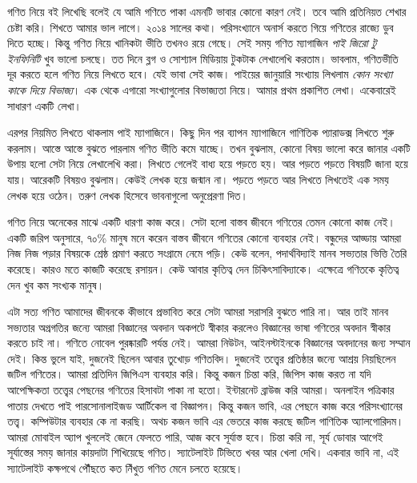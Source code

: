 \documentclass[
]{book}
\begin{document}
গণিত নিয়ে বই লিখেছি বলেই যে আমি গণিতে পাকা এমনটি ভাবার কোনো কারণ নেই। তবে আমি প্রতিনিয়ত শেখার চেষ্টা করি। শিখতে আমার ভাল লাগে। ২০১৪ সালের কথা। পরিসংখ্যানে অনার্স করতে গিয়ে গণিতের রাজ্যে ডুব দিতে হচ্ছে। কিন্তু গণিত নিয়ে খানিকটা ভীতি তখনও রয়ে গেছে। সেই সময় গণিত ম্যাগাজিন \emph{পাই জিরো টু ইনফিনিটি} খুব ভালো চলছে। তত দিনে ব্লগ ও সোশ্যাল মিডিয়ায় টুকটাক লেখালেখি করতাম। ভাবলাম, গণিতভীতি দূর করতে হলে গণিত নিয়ে লিখতে হবে। যেই ভাবা সেই কাজ। পাইয়ের জানুয়ারি সংখ্যায় লিখলাম \emph{কোন সংখ্যা কাকে দিয়ে বিভাজ্য}। এক থেকে এগারো সংখ্যাগুলোর বিভাজ্যতা নিয়ে। আমার প্রথম প্রকাশিত লেখা। একেবারেই সাধারণ একটি লেখা।

এরপর নিয়মিত লিখতে থাকলাম পাই ম্যাগাজিনে। কিছু দিন পর ব্যাপন ম্যাগাজিনে গাণিতিক প্যারাডক্স লিখতে শুরু করলাম। আস্তে আস্তে বুঝতে পারলাম গণিত ভীতি কমে যাচ্ছে। তখন বুঝলাম, কোনো বিষয় ভালো করে জানার একটি উপায় হলো সেটা নিয়ে লেখালেখি করা। লিখতে গেলেই বাধ্য হয়ে পড়তে হয়। আর পড়তে পড়তে বিষয়টি জানা হয়ে যায়। আরেকটি বিষয়ও বুঝলাম। কেউই লেখক হয়ে জন্মান না। পড়তে পড়তে আর লিখতে লিখতেই এক সময় লেখক হয়ে ওঠেন। তরুণ লেখক হিসেবে ভাবনাগুলো অনুপ্রেরণা দিত।

গণিত নিয়ে অনেকের মাঝে একটি ধারণা কাজ করে। সেটা হলো বাস্তব জীবনে গণিতের তেমন কোনো কাজ নেই। একটি জরিপ অনুসারে, ৭০\% মানুষ মনে করেন বাস্তব জীবনে গণিতের কোনো ব্যবহার নেই। বন্ধুদের আড্ডায় আমরা নিজ নিজ পড়ার বিষয়কে শ্রেষ্ঠ প্রমাণ করতে সংগ্রামে নেমে পড়ি। কেউ বলেন, পদার্থবিদ্যাই মানব সভ্যতার ভিত্তি তৈরি করেছে। কারও মতে কাজটি করেছে রসায়ন। কেউ আবার কৃতিত্ব দেন চিকিৎসাবিদ্যাকে। এক্ষেত্রে গণিতকে কৃতিত্ব দেন খুব কম সংখ্যক মানুষ।

এটা সত্য গণিত আমাদের জীবনকে কীভাবে প্রভাবিত করে সেটা আমরা সরাসরি বুঝতে পারি না। আর তাই মানব সভ্যতার অগ্রগতির জন্যে আমরা বিজ্ঞানের অবদান অকপটে স্বীকার করলেও বিজ্ঞানের ভাষা গণিতের অবদান স্বীকার করতে চাই না। গণিতে নোবেল পুরষ্কারটি পর্যন্ত নেই। আমরা নিউটন, আইনস্টাইনকে বিজ্ঞানের অবদানের জন্য সম্মান দেই। কিন্ত ভুলে যাই, দুজনেই ছিলেন আবার তুখোড় গণিতবিদ। দুজনেই তত্ত্বের প্রতিষ্ঠার জন্যে আশ্রয় নিয়ছিলেন জটিল গণিতের।
আমরা প্রতিদিন জিপিএস ব্যবহার করি। কিন্তু কজন চিন্তা করি, জিপিস কাজ করত না যদি আপেক্ষিকতা তত্ত্বের পেছনের গণিতের হিসাবটা পাকা না হতো। ইন্টারনেট ব্রাউজ করি আমরা। অনলাইন পত্রিকার পাতায় দেখতে পাই পারসোনালাইজড আর্টিকেল বা বিজ্ঞাপন। কিন্তু কজন ভাবি, এর পেছনে কাজ করে পরিসংখ্যানের তত্ত্ব। কম্পিউটার ব্যবহার কে না করছি। অথচ কজন ভাবি এর ভেতরে কাজ করছে জটিল গাণিতিক অ্যালগোরিদম। আমরা মোবাইল অ্যাপ খুললেই জেনে ফেলতে পারি, আজ কবে সূর্যাস্ত হবে। চিন্তা করি না, সূর্য ডোবার আগেই সূর্যাস্তের সময় জানার কায়দাটা শিখিয়েছে গণিত। স্যাটেলাইট টিভিতে খবর আর খেলা দেখি। একবার ভাবি না, এই স্যাটেলাইট কক্ষপথে পৌঁছতে কত নিঁখুত গণিত মেনে চলতে হয়েছে।
\end{document}
